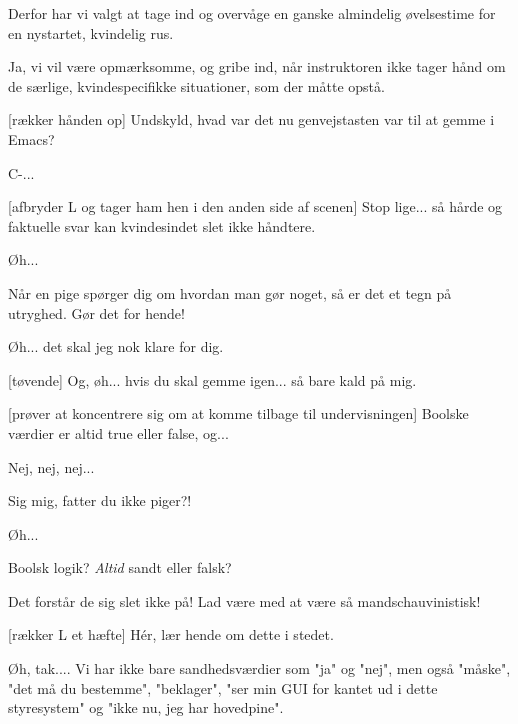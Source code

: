 \documentclass[a4paper,11pt]{article}
\begin{document}
\begin{sketch}
   Derfor har vi valgt at tage ind og overvåge en ganske
  almindelig øvelsestime for en nystartet, kvindelig rus.

   Ja, vi vil være opmærksomme, og gribe ind, når
  instruktoren ikke tager hånd om de særlige, kvindespecifikke
  situationer, som der måtte opstå.


  [rækker hånden op] Undskyld, hvad var det nu genvejstasten
  var til at gemme i Emacs?

   C-...

  [afbryder L og tager ham hen i den anden side af scenen]
  Stop lige... så hårde og faktuelle svar kan kvindesindet slet ikke
  håndtere.

   Øh...

   Når en pige spørger dig om hvordan man gør noget, så er
  det et tegn på utryghed.  Gør det for hende!


   Øh... det skal jeg nok klare for dig.


  [tøvende] Og, øh... hvis du skal gemme igen... så bare kald
  på mig.


  [prøver at koncentrere sig om at komme tilbage til
  undervisningen] Boolske værdier er altid true eller false, og...


   Nej, nej, nej...

   Sig mig, fatter du ikke piger?!

   Øh...

   Boolsk logik?  \textit{Altid} sandt eller falsk?

   Det forstår de sig slet ikke på!  Lad være med at være så
  mandschauvinistisk!

  [rækker L et hæfte] Hér, lær hende om dette i stedet.

   Øh, tak....  Vi har ikke bare sandhedsværdier som "ja" og
  "nej", men også "måske", "det må du bestemme", "beklager", "ser min
  GUI for kantet ud i dette styresystem" og "ikke nu, jeg har
  hovedpine".


\end{sketch}
\end{document}
